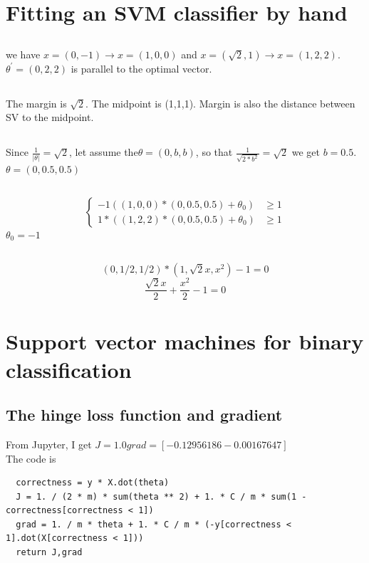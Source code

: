 \documentclass[pdftex,11pt]{article}
\begin{document}
\section{Fitting an SVM classifier by hand}
\subsection{}
we have $x=(0,-1)\rightarrow x=(1,0,0)$ and $x=(\sqrt{2},1)\rightarrow x=(1,2,2)$.\
$\theta^{'}=(0,2,2)$ is parallel to the optimal vector.
\subsection{}
The margin is $\sqrt{2}$. The midpoint is (1,1,1). Margin is also the distance between SV to the midpoint.
\subsection{}
Since $\frac{1}{|\theta|}=\sqrt{2}$, let assume the$ \theta=(0,b,b)$, so that $\frac{1}{\sqrt{2*b^{2}}}=\sqrt{2}$ we get $b=0.5$. $ \theta=(0,0.5,0.5)$
\subsection{}
\begin{equation}
\begin{cases}
-1((1,0,0)*(0,0.5,0.5)+\theta_{0}) & \geqslant1\\
1*((1,2,2)*(0,0.5,0.5)+\theta_{0}) & \geqslant1
\end{cases}
\end{equation}
$\theta_{0}=-1$
\subsection{}
\begin{equation}
(0,1/2,1/2)*(1,\sqrt{2}x,x^{2})-1=0
\end{equation}
\begin{equation}
\frac{\sqrt{2}x}{2}+\frac{x^{2}}{2}-1=0
\end{equation}
\section{Support vector machines for binary classification}


\subsection{The hinge loss function and gradient}
From Jupyter, I get $J =  1.0  grad =  [-0.12956186 -0.00167647]$\\
The code is 
\begin{lstlisting}
  correctness = y * X.dot(theta)
  J = 1. / (2 * m) * sum(theta ** 2) + 1. * C / m * sum(1 - correctness[correctness < 1])
  grad = 1. / m * theta + 1. * C / m * (-y[correctness < 1].dot(X[correctness < 1]))
  return J,grad
\end{lstlisting}
\end{document}
